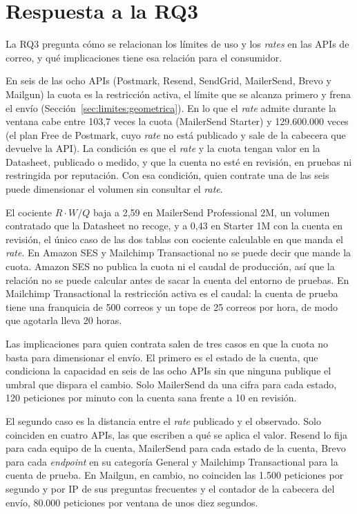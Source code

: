 \section{Respuesta a la RQ3}
\label{sec:limites:respuesta}

La RQ3 pregunta cómo se relacionan los límites de uso y los \textit{rates} en las APIs de correo, y qué implicaciones tiene esa relación para el consumidor.

En seis de las ocho APIs (Postmark, Resend, SendGrid, MailerSend, Brevo y Mailgun) la cuota es la restricción activa, el límite que se alcanza primero y frena el envío (Sección~\ref{sec:limites:geometrica}).
En lo que el \textit{rate} admite durante la ventana cabe entre 103,7 veces la cuota (MailerSend Starter) y 129.600.000 veces (el plan Free de Postmark, cuyo \textit{rate} no está publicado y sale de la cabecera que devuelve la API).
La condición es que el \textit{rate} y la cuota tengan valor en la Datasheet, publicado o medido, y que la cuenta no esté en revisión, en pruebas ni restringida por reputación.
Con esa condición, quien contrate una de las seis puede dimensionar el volumen sin consultar el \textit{rate}.

El cociente $R \cdot W / Q$ baja a 2,59 en MailerSend Professional 2M, un volumen contratado que la Datasheet no recoge, y a 0,43 en Starter 1M con la cuenta en revisión, el único caso de las dos tablas con cociente calculable en que manda el \textit{rate}.
En Amazon SES y Mailchimp Transactional no se puede decir que mande la cuota.
Amazon SES no publica la cuota ni el caudal de producción, así que la relación no se puede calcular antes de sacar la cuenta del entorno de pruebas.
En Mailchimp Transactional la restricción activa es el caudal: la cuenta de prueba tiene una franquicia de 500 correos y un tope de 25 correos por hora, de modo que agotarla lleva 20 horas.

Las implicaciones para quien contrata salen de tres casos en que la cuota no basta para dimensionar el envío.
El primero es el estado de la cuenta, que condiciona la capacidad en seis de las ocho APIs sin que ninguna publique el umbral que dispara el cambio.
Solo MailerSend da una cifra para cada estado, 120 peticiones por minuto con la cuenta sana frente a 10 en revisión.

El segundo caso es la distancia entre el \textit{rate} publicado y el observado.
Solo coinciden en cuatro APIs, las que escriben a qué se aplica el valor.
Resend lo fija para cada equipo de la cuenta, MailerSend para cada estado de la cuenta, Brevo para cada \textit{endpoint} en su categoría General y Mailchimp Transactional para la cuenta de prueba.
En Mailgun, en cambio, no coinciden las 1.500 peticiones por segundo y por IP de sus preguntas frecuentes y el contador de la cabecera del envío, 80.000 peticiones por ventana de unos diez segundos.

